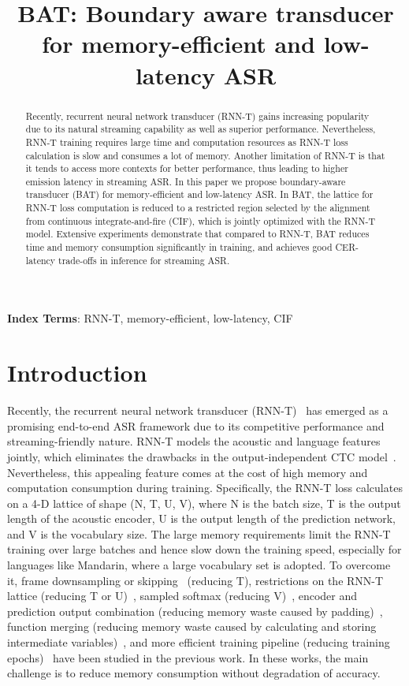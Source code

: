 \documentclass{INTERSPEECH2023}
\title{BAT: Boundary aware transducer for memory-efficient and low-latency ASR}
\begin{document}
\maketitle
 
\begin{abstract}
Recently, recurrent neural network transducer (RNN-T) gains increasing popularity due to its natural streaming capability as well as superior performance. Nevertheless, RNN-T training requires large time and computation resources as RNN-T loss calculation is slow and consumes a lot of memory. Another limitation of RNN-T is that it tends to access more contexts for better performance, thus leading to higher emission latency in streaming ASR. In this paper we propose boundary-aware transducer (BAT) for memory-efficient and low-latency ASR. In BAT, the lattice for RNN-T loss computation is reduced to a restricted region selected by the alignment from continuous integrate-and-fire (CIF), which is jointly optimized with the RNN-T model. Extensive experiments demonstrate that compared to RNN-T, BAT reduces time and memory consumption significantly in training, and achieves good CER-latency trade-offs in inference for streaming ASR.
\end{abstract}
\noindent\textbf{Index Terms}: RNN-T, memory-efficient, low-latency, CIF

\section{Introduction}
Recently, the recurrent neural network transducer (RNN-T)~\cite{rnn-t} has emerged as a promising end-to-end ASR framework due to its competitive performance and streaming-friendly nature. RNN-T models the acoustic and language features jointly, which eliminates the drawbacks in the output-independent CTC model~\cite{ctc}. 
Nevertheless, this appealing feature comes at the cost of high memory and computation consumption during training. Specifically, the RNN-T loss calculates on a 4-D lattice of shape (N, T, U, V), where N is the batch size, T is the output length of the acoustic encoder, U is the output length of the prediction network, and V is the vocabulary size. The large memory requirements limit the RNN-T training over large batches and hence slow down the training speed, especially for languages like Mandarin, where a large vocabulary set is adopted. To overcome it, frame downsampling or skipping~\cite{Wang2022AcceleratingRT} (reducing T), restrictions on the RNN-T lattice (reducing T or U)~\cite{kuang2022pruned,ar-rnnt}, sampled softmax (reducing V)~\cite{Sampled}, encoder and prediction output combination (reducing memory waste caused by padding)~\cite{li2019improving}, function merging (reducing memory waste caused by calculating and storing intermediate variables)~\cite{li2019improving}, and more efficient training pipeline (reducing training epochs)~\cite{Efficient-Training} have been studied in the previous work. In these works, the main challenge is to reduce memory consumption without degradation of accuracy.
\end{document}
